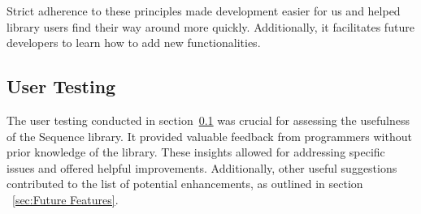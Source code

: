 Strict adherence to these principles made development easier for us and helped
library users find their way around more quickly. Additionally, it facilitates
future developers to learn how to add new functionalities.

\subsection{User Testing}
\label{sub:User Testing}
The user testing conducted in section~\ref{sub:User Testing} was crucial for
assessing the usefulness of the Sequence library. It provided valuable feedback
from programmers without prior knowledge of the library. These insights allowed
for addressing specific issues and offered helpful improvements. Additionally,
other useful suggestions contributed to the list of potential enhancements, as
outlined in section ~\ref{sec:Future Features}.
